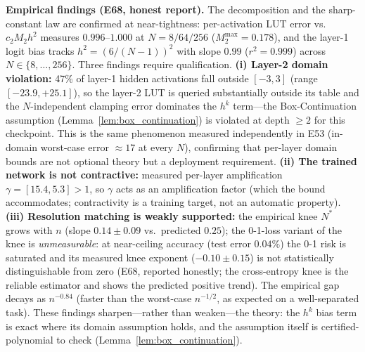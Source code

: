 \vspace{2pt}
\noindent\textbf{Empirical findings (E68, honest report).}
The decomposition and the sharp-constant law are confirmed at
near-tightness: per-activation LUT error vs.\ $c_2 M_2 h^2$ measures
$0.996$--$1.000$ at $N = 8/64/256$ ($M_2^{\max} = 0.178$), and the
layer-1 logit bias tracks $h^2 = (6/(N-1))^2$ with slope $0.99$
($r^2 = 0.999$) across $N \in \{8, \dots, 256\}$. Three findings require
qualification. \textbf{(i) Layer-2 domain violation:} 47\% of layer-1
hidden activations fall outside $[-3,3]$ (range $[-23.9, +25.1]$), so
the layer-2 LUT is queried substantially outside its table and the
$N$-independent clamping error dominates the $h^k$ term---the
Box-Continuation assumption (Lemma~\ref{lem:box_continuation}) is
violated at depth $\geq 2$ for this checkpoint. This is the same
phenomenon measured independently in E53 (in-domain worst-case error
$\approx 17$ at every $N$), confirming that per-layer domain bounds are
not optional theory but a deployment requirement. \textbf{(ii) The
trained network is not contractive:} measured per-layer amplification
$\gamma = [15.4, 5.3] > 1$, so $\gamma$ acts as an amplification factor
(which the bound accommodates; contractivity is a training target, not
an automatic property). \textbf{(iii) Resolution matching is weakly
supported:} the empirical knee $N^{*}$ grows with $n$ (slope
$0.14 \pm 0.09$ vs.\ predicted $0.25$); the 0-1-loss variant of the
knee is \emph{unmeasurable}: at near-ceiling accuracy (test error
$0.04\%$) the 0-1 risk is saturated and its measured knee exponent
($-0.10 \pm 0.15$) is not statistically distinguishable from zero
(E68, reported honestly; the cross-entropy knee is the reliable
estimator and shows the predicted positive trend). The empirical gap
decays as $n^{-0.84}$ (faster than the worst-case $n^{-1/2}$, as
expected on a well-separated task). These findings sharpen---rather
than weaken---the theory: the $h^k$ bias term is exact where its
domain assumption holds,
and the assumption itself is certified-polynomial to check
(Lemma~\ref{lem:box_continuation}).

